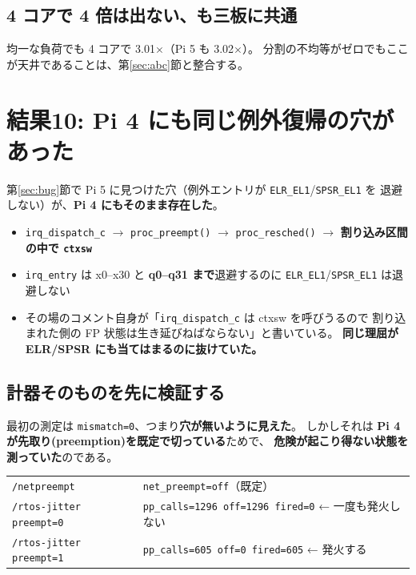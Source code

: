 \documentclass[a4paper,11pt]{ltjsarticle}
\begin{document}
\subsection{4 コアで 4 倍は出ない、も三板に共通}
均一な負荷でも 4 コアで 3.01$\times$（Pi 5 も 3.02$\times$）。
分割の不均等がゼロでもここが天井であることは、第\ref{sec:abc}節と整合する。

\section{結果10: Pi 4 にも同じ例外復帰の穴があった}\label{sec:pi4bug}

第\ref{sec:bug}節で Pi 5 に見つけた穴（例外エントリが \texttt{ELR\_EL1}/\texttt{SPSR\_EL1} を
退避しない）が、\textbf{Pi 4 にもそのまま存在した}。

\begin{itemize}
\item \texttt{irq\_dispatch\_c} $\to$ \texttt{proc\_preempt()} $\to$ \texttt{proc\_resched()}
      $\to$ \textbf{割り込み区間の中で \texttt{ctxsw}}
\item \texttt{irq\_entry} は x0--x30 と \textbf{q0--q31 まで}退避するのに
      \texttt{ELR\_EL1}/\texttt{SPSR\_EL1} は退避しない
\item その場のコメント自身が「\texttt{irq\_dispatch\_c} は ctxsw を呼びうるので
      割り込まれた側の FP 状態は生き延びねばならない」と書いている。
      \textbf{同じ理屈が ELR/SPSR にも当てはまるのに抜けていた。}
\end{itemize}

\subsection{計器そのものを先に検証する}
最初の測定は \texttt{mismatch=0}、つまり\textbf{穴が無いように見えた}。
しかしそれは \textbf{Pi 4 が先取り(preemption)を既定で切っている}ためで、
\textbf{危険が起こり得ない状態を測っていた}のである。

\begin{center}
\begin{tabular}{ll}
\toprule
\texttt{/netpreempt} & \texttt{net\_preempt=off}（既定） \\
\texttt{/rtos-jitter preempt=0} & \texttt{pp\_calls=1296 off=1296 fired=0} ← 一度も発火しない \\
\texttt{/rtos-jitter preempt=1} & \texttt{pp\_calls=605 off=0 fired=605} ← 発火する \\
\bottomrule
\end{tabular}
\end{center}
\end{document}
